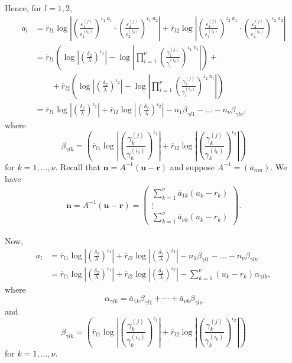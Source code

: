Hence, for $l =1,2$,
\begin{align*}
a_l	& = \overline{r}_{l1}\log\left|\left(\frac{\varepsilon_1^{(j)}}{\varepsilon_1^{(i_0)}}\right)^{\iota_1 \ a_1} 		\cdot \left(\frac{\varepsilon_2^{(j)}}{\varepsilon_2^{(i_0)}}\right)^{\iota_1 \ a_2}\right| + 
	\overline{r}_{l2}\log\left|\left(\frac{\varepsilon_1^{(j)}}{\varepsilon_1^{(i_0)}}\right)^{\iota_2\ a_1}
	\cdot \left(\frac{\varepsilon_2^{(j)}}{\varepsilon_2^{(i_0)}}\right)^{\iota_2 \ a_2}\right|\\
	& = \overline{r}_{l1}\left( \log\left|\left(\frac{\delta_2}{\lambda}\right)^{\iota_1}\right| - \log\left| \prod_{i = 1}^{\nu} \left( \frac{\gamma_i^{(j)}}{\gamma_i^{(i_0)}}\right)^{\iota_1 \ n_i}\right|\right) + \\ 
	& \quad \quad + \overline{r}_{l2}\left( \log\left|\left(\frac{\delta_2}{\lambda}\right)^{\iota_2}\right| - \log\left| \prod_{i = 1}^{\nu} \left( \frac{\gamma_i^{(j)}}{\gamma_i^{(i_0)}}\right)^{\iota_2 \ n_i}\right|\right)\\
	& = \overline{r}_{l1}\log\left|\left(\frac{\delta_2}{\lambda}\right)^{\iota_1}\right| + \overline{r}_{l2}\log\left|\left(\frac{\delta_2}{\lambda}\right)^{\iota_2}\right| - n_1\beta_{\gamma l 1} - \dots - n_{\nu}\beta_{\gamma l \nu},
\end{align*}
where
\[\beta_{\gamma l k} = \left(\overline{r}_{l1} \log\left| \left( \frac{\gamma_k^{(j)}}{\gamma_k^{(i_0)}}\right)^{\iota_1}\right|+ \overline{r}_{l2}\log\left| \left( \frac{\gamma_k^{(j)}}{\gamma_k^{(i_0)}}\right)^{\iota_2}\right|\right)\]
for $k = 1, \dots, \nu$. Recall that $\mathbf{n} = A^{-1}(\mathbf{u} - \mathbf{r})$ and suppose $A^{-1} = (\overline{a}_{nm})$. We have
\begin{align*}
\mathbf{n}  = A^{-1}(\mathbf{u} - \mathbf{r})
	 = \begin{pmatrix} \sum_{k=1}^{\nu} \overline{a}_{1k}(u_k-r_k)\\  \vdots \\ \sum_{k=1}^{\nu} \overline{a}_{\nu k}(u_k-r_k) \end{pmatrix}.
\end{align*}

Now, 
\begin{align*}
a_l 	& = \overline{r}_{l1}\log\left|\left(\frac{\delta_2}{\lambda}\right)^{\iota_1}\right| + \overline{r}_{l2}\log\left|\left(\frac{\delta_2}{\lambda}\right)^{\iota_2}\right| - n_1\beta_{\gamma l 1} - \dots - n_{\nu}\beta_{\gamma l \nu}\\
	& = \overline{r}_{l1}\log\left|\left(\frac{\delta_2}{\lambda}\right)^{\iota_1}\right| + \overline{r}_{l2}\log\left|\left(\frac{\delta_2}{\lambda}\right)^{\iota_2}\right| - \sum_{k=1}^{\nu}(u_k-r_k)\alpha_{\gamma l k},
\end{align*}
where
\[\alpha_{\gamma l k} = \overline{a}_{1k}\beta_{\gamma l 1} + \cdots + \overline{a}_{\nu k}\beta_{\gamma l \nu}\]
and
\[\beta_{\gamma l k} = \left(\overline{r}_{l1} \log\left| \left( \frac{\gamma_k^{(j)}}{\gamma_k^{(i_0)}}\right)^{\iota_1}\right|+ \overline{r}_{l2}\log\left| \left( \frac{\gamma_k^{(j)}}{\gamma_k^{(i_0)}}\right)^{\iota_2}\right|\right)\]
for $k = 1, \dots, \nu$.

